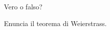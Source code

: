 \documentclass[senzagrazie,14pt]{verifica}
\begin{document}
\begin{esercizi}[itemsep=1.1em]
{\begin{multicols}{2}
\end{multicols}}

\item Vero o falso? 

{\setlength\columnsep{1.3cm} %
\begin{multicols}{2}
\begin{test-verofalso}[leftmargin=*]
\end{test-verofalso}
\end{multicols}}

\item Enuncia il teorema di Weierstrass.  


\end{esercizi}

\totpunti[/10+2]
\end{document}
